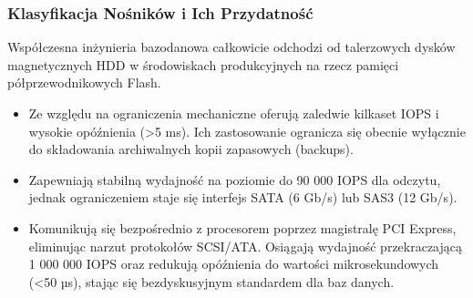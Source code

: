 \documentclass[a4paper,11pt,english,openany,oneside]{sphinxmanual}
\begin{document}
\subsubsection{Klasyfikacja Nośników i Ich Przydatność}
\label{\detokenize{rozdzial_2/rozdzial_21/index:klasyfikacja-nosnikow-i-ich-przydatnosc}}
\sphinxAtStartPar
Współczesna inżynieria bazodanowa całkowicie odchodzi od talerzowych dysków magnetycznych HDD w środowiskach produkcyjnych na rzecz pamięci półprzewodnikowych Flash.
\begin{itemize}
\item {} 
\sphinxAtStartPar
{} Ze względu na ograniczenia mechaniczne oferują zaledwie kilkaset IOPS i wysokie opóźnienia (\textgreater{}5 ms). Ich zastosowanie ogranicza się obecnie wyłącznie do składowania archiwalnych kopii zapasowych (backups).

\item {} 
\sphinxAtStartPar
{} Zapewniają stabilną wydajność na poziomie do 90 000 IOPS dla odczytu, jednak ograniczeniem staje się interfejs SATA (6 Gb/s) lub SAS\sphinxhyphen{}3 (12 Gb/s).

\item {} 
\sphinxAtStartPar
{} Komunikują się bezpośrednio z procesorem poprzez magistralę PCI Express, eliminując narzut protokołów SCSI/ATA. Osiągają wydajność przekraczającą 1 000 000 IOPS oraz redukują opóźnienia do wartości mikrosekundowych (\textless{}50 µs), stając się bezdyskusyjnym standardem dla baz danych.

\end{itemize}
\end{document}
